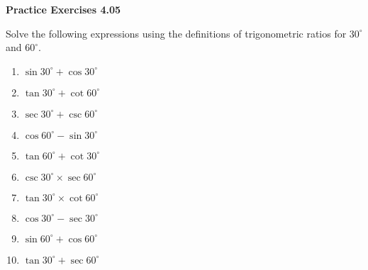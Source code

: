 \vspace{0.3ex}
\noindent\textbf{Practice Exercises 4.05}

\vspace{0.2ex}

Solve the following expressions using the definitions of trigonometric ratios for \( 30^\circ \) and \( 60^\circ \).
\begin{multicols}{2}
\begin{enumerate}
    \item \( \sin 30^\circ + \cos 30^\circ \)
    \item \( \tan 30^\circ + \cot 60^\circ \)
    \item \( \sec 30^\circ + \csc 60^\circ \)
    \item \( \cos 60^\circ - \sin 30^\circ \)
    \item \( \tan 60^\circ + \cot 30^\circ \)
    \item \( \csc 30^\circ \times \sec 60^\circ \)
    \item \( \tan 30^\circ \times \cot 60^\circ \)
    \item \( \cos 30^\circ - \sec 30^\circ \)
    \item \( \sin 60^\circ + \cos 60^\circ \)
    \item \( \tan 30^\circ + \sec 60^\circ \)
\end{enumerate}
\end{multicols}
